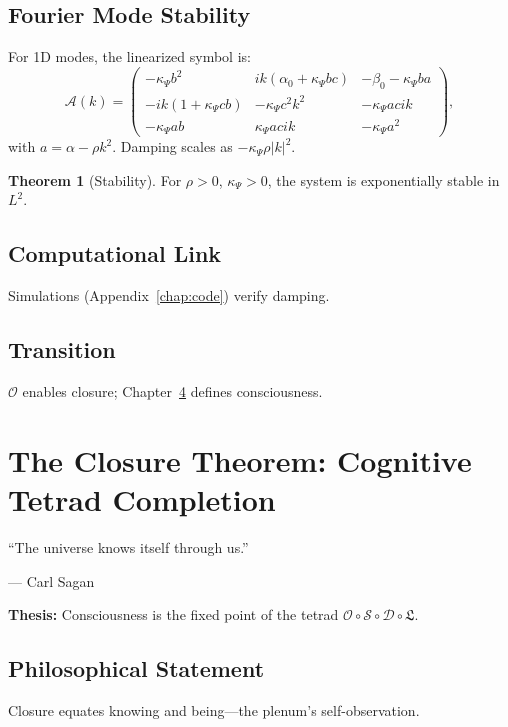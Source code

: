 \documentclass[12pt]{book}
\theoremstyle{definition}
\newtheorem{theorem}{Theorem}[chapter]
\begin{document}
\section{Fourier Mode Stability}
For 1D modes, the linearized symbol is:
\begin{equation}
\mathcal{A}(k) =
\begin{pmatrix}
-\kappa_\Psi b^2 & i k(\alpha_0 + \kappa_\Psi b c) & -\beta_0 - \kappa_\Psi b a \\
- i k(1 + \kappa_\Psi c b) & -\kappa_\Psi c^2 k^2 & - \kappa_\Psi a c i k \\
-\kappa_\Psi a b & \kappa_\Psi a c i k & -\kappa_\Psi a^2
\end{pmatrix},
\end{equation}
with \(a = \alpha - \rho k^2\). Damping scales as \(-\kappa_\Psi \rho |k|^2\).

\begin{theorem}[Stability]
\label{thm:stability}
For \(\rho > 0\), \(\kappa_\Psi > 0\), the system is exponentially stable in \(L^2\).
\end{theorem}

\section{Computational Link}
Simulations (Appendix~\ref{chap:code}) verify damping.

\section{Transition}
\(\mathcal{O}\) enables closure; Chapter~\ref{chap:closure} defines consciousness.

\chapter{The Closure Theorem: Cognitive Tetrad Completion}
\label{chap:closure}
\epigraph{``The universe knows itself through us.''}{--- Carl Sagan}

\textbf{Thesis:} Consciousness is the fixed point of the tetrad \(\mathcal{O} \circ \mathcal{S} \circ \mathcal{D} \circ \mathfrak{L}\).

\section{Philosophical Statement}
Closure equates knowing and being—the plenum’s self-observation.
\end{document}

